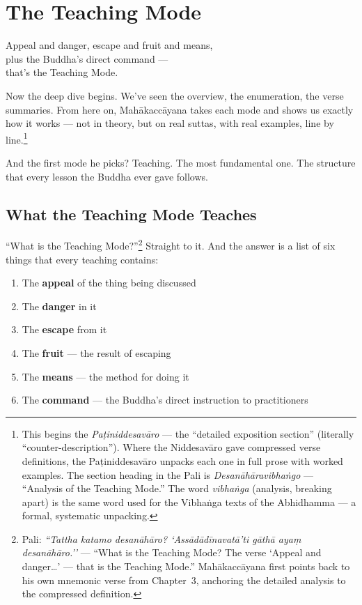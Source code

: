 \chapter{The Teaching Mode}
\label{ch:teaching}

\begin{versebox}
Appeal and danger, escape and fruit and means,\\
plus the Buddha's direct command ---\\
that's the Teaching Mode.
\end{versebox}

\noindent Now the deep dive begins. We've seen the overview, the enumeration, the verse summaries. From here on, Mahākaccāyana takes each mode and shows us exactly how it works --- not in theory, but on real suttas, with real examples, line by line.\footnote{This begins the \textit{Paṭiniddesavāro} --- the ``detailed exposition section'' (literally ``counter-description''). Where the Niddesavāro gave compressed verse definitions, the Paṭiniddesavāro unpacks each one in full prose with worked examples. The section heading in the Pali is \textit{Desanāhāravibhaṅgo} --- ``Analysis of the Teaching Mode.'' The word \textit{vibhaṅga} (analysis, breaking apart) is the same word used for the Vibhaṅga texts of the Abhidhamma --- a formal, systematic unpacking.}

And the first mode he picks? Teaching. The most fundamental one. The structure that every lesson the Buddha ever gave follows.

\section*{What the Teaching Mode Teaches}

``What is the Teaching Mode?''\footnote{Pali: \textit{``Tattha katamo desanāhāro? `Assādādīnavatā'ti gāthā ayaṃ desanāhāro.''} --- ``What is the Teaching Mode? The verse `Appeal and danger\ldots' --- that is the Teaching Mode.'' Mahākaccāyana first points back to his own mnemonic verse from Chapter~3, anchoring the detailed analysis to the compressed definition.} Straight to it. And the answer is a list of six things that every teaching contains:

\begin{enumerate}[itemsep=4pt]
\item The \textbf{appeal} of the thing being discussed
\item The \textbf{danger} in it
\item The \textbf{escape} from it
\item The \textbf{fruit} --- the result of escaping
\item The \textbf{means} --- the method for doing it
\item The \textbf{command} --- the Buddha's direct instruction to practitioners
\end{enumerate}

